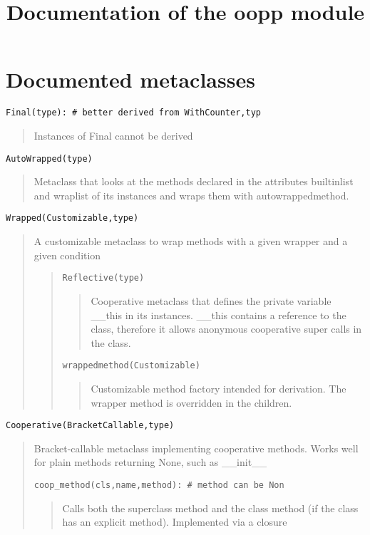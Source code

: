 \documentclass[10pt,english]{article}
\title{Documentation of the oopp module}
\author{}
\date{}
\begin{document}
\maketitle




\hypertarget{documented-metaclasses}{}
\section*{Documented metaclasses}

\texttt{Final(type): {\#} better derived from WithCounter,typ}
\begin{quote}

Instances of Final cannot be derived
\end{quote}

\texttt{AutoWrapped(type)}
\begin{quote}

Metaclass that looks at the methods declared in the attributes 
builtinlist and wraplist of its instances and wraps them with
autowrappedmethod.
\end{quote}

\texttt{Wrapped(Customizable,type)}
\begin{quote}

A customizable metaclass to wrap methods with a given wrapper and
a given condition
\begin{quote}

\texttt{Reflective(type)}
\begin{quote}

Cooperative metaclass that defines the private variable {\_}{\_}this in
its instances. {\_}{\_}this contains a reference to the class, therefore
it allows anonymous cooperative super calls in the class.
\end{quote}

\texttt{wrappedmethod(Customizable)}
\begin{quote}

Customizable method factory intended for derivation.
The wrapper method is overridden in the children.
\end{quote}
\end{quote}
\end{quote}

\texttt{Cooperative(BracketCallable,type)}
\begin{quote}

Bracket-callable metaclass implementing cooperative methods. Works
well for plain methods returning None, such as {\_}{\_}init{\_}{\_}

\texttt{coop{\_}method(cls,name,method): {\#} method can be Non}
\begin{quote}

Calls both the superclass method and the class method (if the 
class has an explicit method). Implemented via a closure
\end{quote}
\end{quote}
\end{document}
